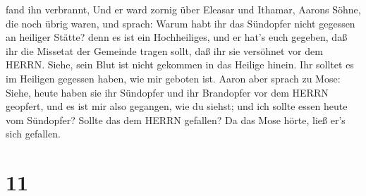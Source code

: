 fand ihn verbrannt, Und er ward zornig über Eleasar und Ithamar, Aarons
Söhne, die noch übrig waren, und sprach:  Warum habt ihr
das Sündopfer nicht gegessen an heiliger Stätte? denn es ist ein
Hochheiliges, und er hat's euch gegeben, daß ihr die Missetat der
Gemeinde tragen sollt, daß ihr sie versöhnet vor dem HERRN.
 Siehe, sein Blut ist nicht gekommen in das Heilige hinein.
Ihr solltet es im Heiligen gegessen haben, wie mir geboten ist.
 Aaron aber sprach zu Mose: Siehe, heute haben sie ihr
Sündopfer und ihr Brandopfer vor dem HERRN geopfert, und es ist mir also
gegangen, wie du siehst; und ich sollte essen heute vom Sündopfer?
Sollte das dem HERRN gefallen?  Da das Mose hörte, ließ
er's sich gefallen.

\hypertarget{section-10}{%
\section{11}\label{section-10}}

